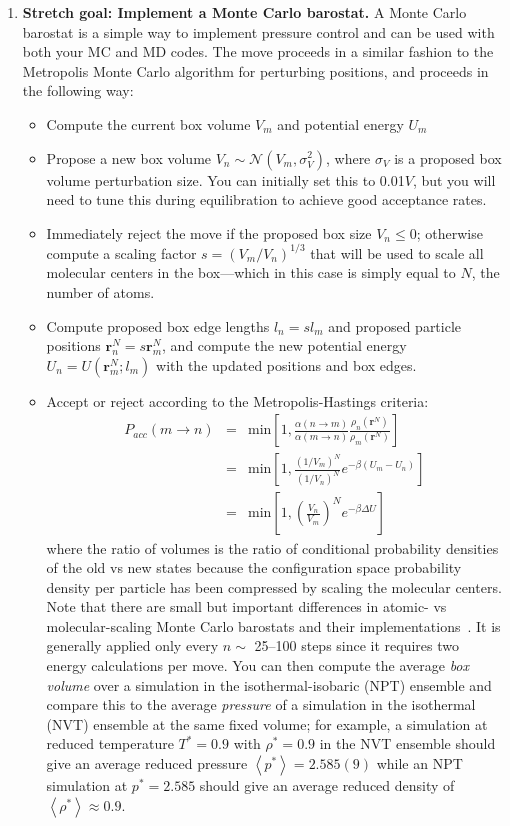 \documentclass[aip,jcp,preprint,superscriptaddress,floatfix]{revtex4-1}
\begin{document}
\begin{enumerate}
\item \textbf{Stretch goal: Implement a Monte Carlo barostat.}
A Monte Carlo barostat is a simple way to implement pressure control and can be used with both your MC and MD codes.
The move proceeds in a similar fashion to the Metropolis Monte Carlo algorithm for perturbing positions, and proceeds in the following way:
	\begin{itemize}
	\setlength{\itemsep}{0em} %
	\item Compute the current box volume $V_m$ and potential energy $U_m$
	\item Propose a new box volume $V_n \sim \mathcal{N}(V_m, \sigma_V^2)$, where $\sigma_V$ is a proposed box volume perturbation size. You can initially set this to 0.01$V$, but you will need to tune this during equilibration to achieve good acceptance rates.
	\item Immediately reject the move if the proposed box size $V_n \le 0$; otherwise compute a scaling factor $s = (V_m / V_n)^{1/3}$ that will be used to scale all molecular centers in the box---which in this case is simply equal to $N$, the number of atoms.
	\item Compute proposed box edge lengths $l_n = s l_m$ and  proposed particle positions $\mathbf{r}^N_n = s \mathbf{r}^N_m$, and compute the new potential energy $U_n = U(\mathbf{r}^N_m; l_m)$ with the updated positions and box edges.
	\item Accept or reject according to the Metropolis-Hastings criteria:
	\begin{eqnarray}
	P_{acc}(m \rightarrow n) &=& \text{min} \left[1,\frac{\alpha \left(n
		\rightarrow m \right)}{\alpha \left(m \rightarrow n \right)}
		\frac{\rho_n\left(\textbf{r}^N\right)}{\rho_m\left(\textbf{r}^N\right)}
	\right] 
	\label{eq.MetropolisHastings} \\
	&=& \text{min} \left[1,\frac{(1/V_m)^N}{(1/V_n)^N} e^{-\beta (U_m - U_n)}	\right]  \\	
	&=& \text{min} \left[1,\left(\frac{V_n}{V_m}\right)^N e^{-\beta \Delta U} \right]
	\end{eqnarray}
	where the ratio of volumes is the ratio of conditional probability densities of the old vs new states because the configuration space probability density per particle has been compressed by scaling the molecular centers.
	Note that there are small but important differences in atomic- vs molecular-scaling Monte Carlo barostats and their implementations~\cite{Ferguson.CompPhysComm.91.283.1995}.
	It is generally applied only every $n \sim$ 25--100 steps since it requires two energy calculations per move.
	You can then compute the average \emph{box volume} over a simulation in the isothermal-isobaric (NPT) ensemble and compare this to the average \emph{pressure} of a simulation in the isothermal (NVT) ensemble at the same fixed volume; for example, a simulation at reduced temperature $T^* = 0.9$ with $\rho^* = 0.9$ in the NVT ensemble should give an average reduced pressure $\left<p^*\right> = 2.585(9)$ while an NPT simulation at $p^* = 2.585$ should give an average reduced density of $\left<\rho^*\right> \approx 0.9$.
	\end{itemize}

\end{enumerate}


\newpage
%


\end{document}
